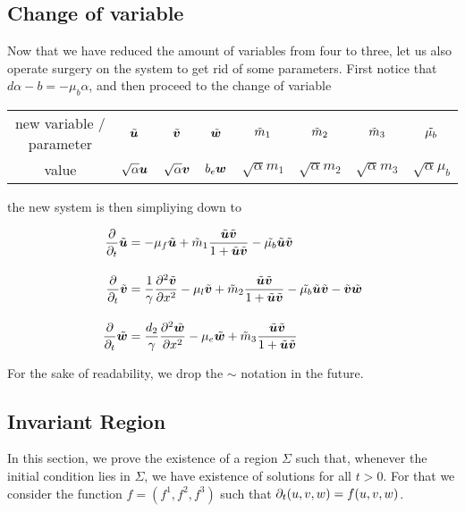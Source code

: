 \subsection{Change of variable}

Now that we have reduced the amount of variables from four to three, let us also operate surgery on the system to get rid of some parameters. First notice that $d\alpha - b = -\mu_b \alpha$, and then proceed to the change of variable 

\begin{center}
\begin{tabular}{cccccccc}
	new variable / parameter & $\Tilde{\bm{u}}$ & $ \Tilde{\bm{v}}$ & $ \Tilde{\bm{w}}$ & $\Tilde{m}_1 $ & $\Tilde{m}_2$ & $\Tilde{m}_3$ & $\Tilde{\mu_b}$  \\[0.8em]
	value & $\sqrt{\alpha} \bm{u}$ & $\sqrt{\alpha} \bm{v}$ & $b_e \bm{w}$ & $\sqrt{\alpha} m_1$ & $\sqrt{\alpha} m_2$ & $\sqrt{\alpha} m_3$ &  $\sqrt{\alpha} \mu_b $
\end{tabular}
\end{center}

the new system is then simpliying down to

\begin{align}
	\label{system}
	 \dfrac{\partial}{\partial_t} \Tilde{\bm{u}} &= -\mu_f \Tilde{\bm{u}} + \Tilde{m}_1 \dfrac{ \Tilde{\bm{u}} \Tilde{\bm{v}}}{1 +  \Tilde{\bm{u}} \Tilde{\bm{v}}} - \Tilde{\mu_b} \Tilde{\bm{u}} \Tilde{ \bm{v}}  \notag \\[1em]
	\dfrac{\partial}{\partial_t} \Tilde{\bm{v}} &= \dfrac{1}{\gamma} \frac{\partial^2 \Tilde{\bm{v}}}{\partial x^2} - \mu_l  \Tilde{\bm{v}} +\Tilde{ m}_2 \dfrac{ \Tilde{\bm{u}} \Tilde{\bm{v}}}{1 +  \Tilde{\bm{u}}\Tilde{\bm{v}}} - \Tilde{\mu_b} \Tilde{ \bm{u}} \Tilde{ \bm{v}} - \Tilde{\bm{v}} \Tilde{\bm{w}}  \\[1em]
	\dfrac{\partial}{\partial_t} \Tilde{\bm{w}} &= \dfrac{d_2}{\gamma} \frac{\partial^2 \Tilde{\bm{w}}}{\partial x^2} - \mu_e\Tilde{ \bm{w}} + \Tilde{m}_3 \dfrac{\Tilde{\bm{u}}\Tilde{\bm{v}}}{1 + \Tilde{\bm{u}}\Tilde{\bm{v}}} \notag
\end{align}

For the sake of readability, we drop the $\sim$ notation in the future.

\subsection{Invariant Region}

In this section, we prove the existence of a region $\Sigma$ such that, whenever the initial condition lies in $\Sigma$, we have existence of solutions for all $t > 0$. For that we consider the function $f = (f^1, f^2, f^3)$ such that $\partial_t (u, v, w) = f(u, v, w)$.

